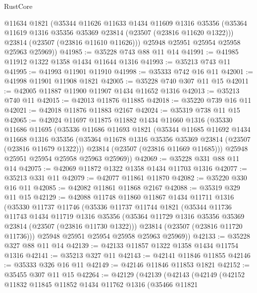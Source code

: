 \begin{lexlean}{RustCore}
\begin{coremodule}
        @11634
        @1821
        (@35344
          @11626
          @11633
          @1434
          @11609
          @1316
          @35356
          (@35364 @11619 @1316 @35356 @35369 @23814 (@23507 (@23816 @11620 @1322)))
          @23814
          (@23507 (@23816 @11610 @11626)))
        @25948
        @25951
        @25954
        @25958
        @25963
        @25969))
@41985 := @35228 @743 @88 @11 @14
@41991 := @41985 @11912 @1322 @1358 @1434 @11644 @1316
@41993 := @35213 @743 @11
@41995 := @41993 @11901 @11910
@41998 := @35333 @742 @16 @11
@42001 := @41998 @11901 @11908 @1821
@42005 := @35228 @740 @307 @11 @15
@42011 := @42005 @11887 @11900 @11907 @1434 @11652 @1316
@42013 := @35213 @740 @11
@42015 := @42013 @11876 @11885
@42018 := @35220 @739 @16 @11
@42021 := @42018 @11876 @11883 @2167
@42024 := @35319 @738 @11 @15
@42065 := @42024
    @11697
    @11875
    @11882
    @1434
    @11660
    @1316
    (@35330
      @11686
      @11695
      (@35336
        @11686
        @11693
        @1821
        (@35344
          @11685
          @11692
          @1434
          @11668
          @1316
          @35356
          (@35364 @11678 @1316 @35356 @35369 @23814 (@23507 (@23816 @11679 @1322)))
          @23814
          (@23507 (@23816 @11669 @11685)))
        @25948
        @25951
        @25954
        @25958
        @25963
        @25969))
@42069 := @35228 @331 @88 @11 @14
@42075 := @42069 @11872 @1322 @1358 @1434 @11703 @1316
@42077 := @35213 @331 @11
@42079 := @42077 @11861 @11870
@42082 := @35220 @330 @16 @11
@42085 := @42082 @11861 @11868 @2167
@42088 := @35319 @329 @11 @15
@42129 := @42088
    @11748
    @11860
    @11867
    @1434
    @11711
    @1316
    (@35330
      @11737
      @11746
      (@35336
        @11737
        @11744
        @1821
        (@35344
          @11736
          @11743
          @1434
          @11719
          @1316
          @35356
          (@35364 @11729 @1316 @35356 @35369 @23814 (@23507 (@23816 @11730 @1322)))
          @23814
          (@23507 (@23816 @11720 @11736)))
        @25948
        @25951
        @25954
        @25958
        @25963
        @25969))
@42133 := @35228 @327 @88 @11 @14
@42139 := @42133 @11857 @1322 @1358 @1434 @11754 @1316
@42141 := @35213 @327 @11
@42143 := @42141 @11846 @11855
@42146 := @35333 @326 @16 @11
@42149 := @42146 @11846 @11853 @1821
@42152 := @35455 @307 @11 @15
@42264 := @42129
    (@42139
      (@42143
        (@42149
          (@42152
            @11832
            @11845
            @11852
            @1434
            @11762
            @1316
            (@35466
              @11821

\end{coremodule}
\end{lexlean}
